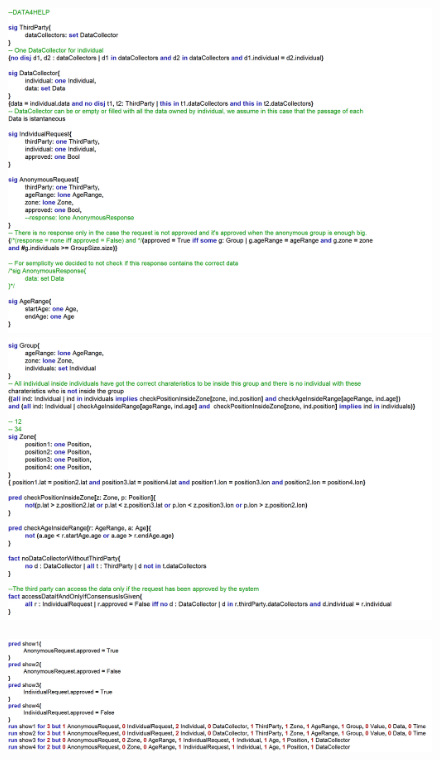 \documentclass{article}
\begin{document}
\begin{legal}
\begin{figure}[H]
			\includegraphics[width=\linewidth]{./images/alloy/code/data4Help_3.PNG}
			\includegraphics[width=\linewidth]{./images/alloy/code/data4Help_4.PNG}
		\end{figure}
		\begin{figure}[H]
			\includegraphics[width=\linewidth]{./images/alloy/code/data4Help_5.PNG}
		\end{figure}
		\newpage
		\begin{figure}[H]

\end{figure}
\end{legal}
\end{document}

